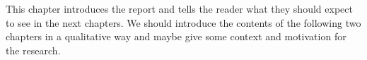 \label{ch:introduction}
This chapter introduces the report and tells the reader what they should expect
to see in the next chapters. We should introduce the contents of the
following two chapters in a qualitative way and maybe give some context and
motivation for the research.
